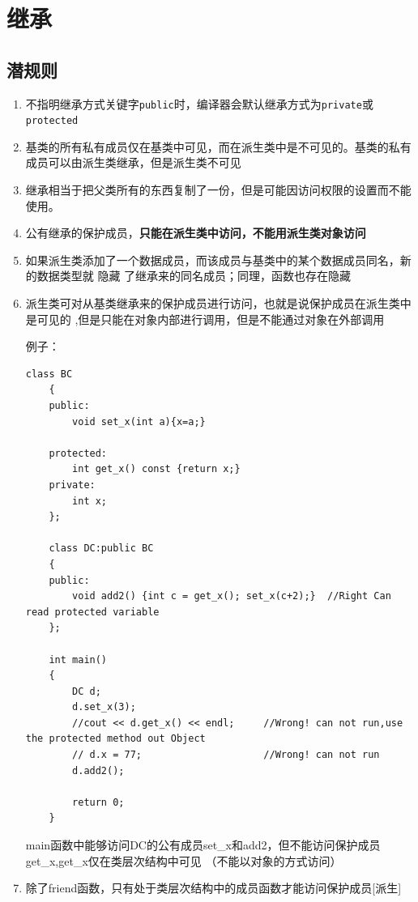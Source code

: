 \documentclass[UTF8,a4paper,12pt]{ctexbook} %
\begin{document}
\chapter{继承}
	\section{潜规则}
	       \begin{enumerate}[fullwidth,itemindent=2em,label=(\arabic*)]
	       	\item   不指明继承方式关键字\verb|public|时，编译器会默认继承方式为\verb|private|或\verb|protected|
	       	\item   基类的所有私有成员仅在基类中可见，而在派生类中是不可见的。基类的私有成员可以由派生类继承，但是派生类不可见
	       	\item   继承相当于把父类所有的东西复制了一份，但是可能因访问权限的设置而不能使用。
	       	\item   公有继承的保护成员，\textbf{只能在派生类中访问，不能用派生类对象访问}
	       	\item   如果派生类添加了一个数据成员，而该成员与基类中的某个数据成员同名，新的数据类型就  隐藏  了继承来的同名成员；同理，函数也存在隐藏
	       	\item   派生类可对从基类继承来的保护成员进行访问，也就是说保护成员在派生类中是可见的 ,但是只能在对象内部进行调用，但是不能通过对象在外部调用
	       	
	       	例子：
		       	 \begin{lstlisting}[language={[ANSI]C++}]
	class BC
	{
	public:
		void set_x(int a){x=a;}
	
	protected:
		int get_x() const {return x;}
	private:
		int x;
	};
	
	class DC:public BC
	{
	public:
		void add2() {int c = get_x(); set_x(c+2);}  //Right Can read protected variable
	};
	
	int main()
	{
		DC d;
		d.set_x(3);
		//cout << d.get_x() << endl;     //Wrong! can not run,use the protected method out Object
		// d.x = 77;                     //Wrong! can not run
		d.add2();
		
		return 0;
	}	       	
		       	\end{lstlisting}
	       \qquad \color{blue}	{main函数中能够访问DC的公有成员set\_x和add2，但不能访问保护成员get\_x,get\_x仅在类层次结构中可见 （不能以对象的方式访问）}
	       
	       \color{black}  \item  {除了friend函数，只有处于类层次结构中的成员函数才能访问保护成员[派生]}
	     

\end{enumerate}
\end{document}
